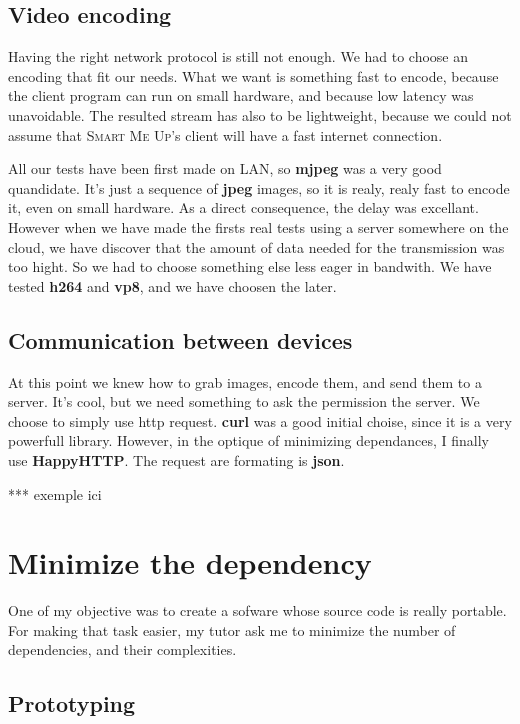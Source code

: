 \documentclass[a4paper,11pt]{custom}
\newcommand{\smu}{\textsc{Smart Me Up}}
\newcommand{\curl}{\textbf{curl}}
\newcommand{\happyhttp}{\textbf{HappyHTTP}}
\newcommand{\mjpeg}{\textbf{mjpeg}}
\newcommand{\jpeg}{\textbf{jpeg}}
\newcommand{\vpx}{\textbf{vp8}}
\newcommand{\mpeg}{\textbf{h264}}
\newcommand{\json}{\textbf{json}}
\begin{document}
\subsection{Video encoding}

Having the right network protocol is still not enough. We had to choose an
encoding that fit our needs. What we want is something fast to encode,
because the client program can run on small hardware, and because low latency
was unavoidable. The resulted stream has also to be lightweight, because we
could not assume that \smu's client will have a fast internet connection.

All our tests have been first made on LAN, so \mjpeg{} was a very good
quandidate. It's just a sequence of \jpeg{} images, so it is realy, realy fast
to encode it, even on small hardware. As a direct consequence, the delay was
excellant. However when we have made the firsts real tests using a server
somewhere on the cloud, we have discover that the amount of data needed for the
transmission was too hight. So we had to choose something else less eager in
bandwith. We have tested \mpeg{} and \vpx, and we have choosen the later.

\subsection{Communication between devices}
\label{sec:communication}

At this point we knew how to grab images, encode them, and send them to a
server. It's cool, but we need something to ask the permission the server. We
choose to simply use http request. \curl{} was a good initial choise, since it
is a very powerfull library. However, in the optique of minimizing dependances,
I finally use \happyhttp. The request are formating is \json.

*** exemple ici

\section{Minimize the dependency}

One of my objective was to create a sofware whose source code is really
portable. For making that task easier, my tutor ask me to minimize the number of
dependencies, and their complexities.

\subsection{Prototyping}
\end{document}
